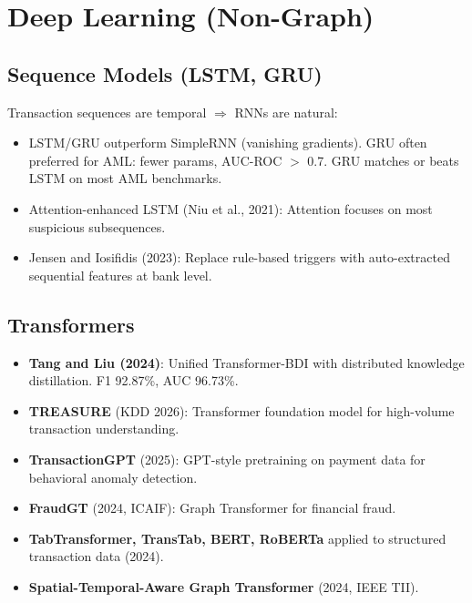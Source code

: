 \documentclass[11pt]{article}
\begin{document}
\section{Deep Learning (Non-Graph)}

\subsection{Sequence Models (LSTM, GRU)}

Transaction sequences are temporal $\Rightarrow$ RNNs are natural:

\begin{itemize}
\item LSTM/GRU outperform SimpleRNN (vanishing gradients). GRU often preferred for AML: fewer params, AUC-ROC $>$ 0.7. GRU matches or beats LSTM on most AML benchmarks.
\item Attention-enhanced LSTM (Niu et al., 2021): Attention focuses on most suspicious subsequences.
\item Jensen and Iosifidis (2023): Replace rule-based triggers with auto-extracted sequential features at bank level.
\end{itemize}

\subsection{Transformers}

\begin{itemize}
\item \textbf{Tang and Liu (2024)}: Unified Transformer-BDI with distributed knowledge distillation. F1 92.87\%, AUC 96.73\%.
\item \textbf{TREASURE} (KDD 2026): Transformer foundation model for high-volume transaction understanding.
\item \textbf{TransactionGPT} (2025): GPT-style pretraining on payment data for behavioral anomaly detection.
\item \textbf{FraudGT} (2024, ICAIF): Graph Transformer for financial fraud.
\item \textbf{TabTransformer, TransTab, BERT, RoBERTa} applied to structured transaction data (2024).
\item \textbf{Spatial-Temporal-Aware Graph Transformer} (2024, IEEE TII).
\end{itemize}
\end{document}
